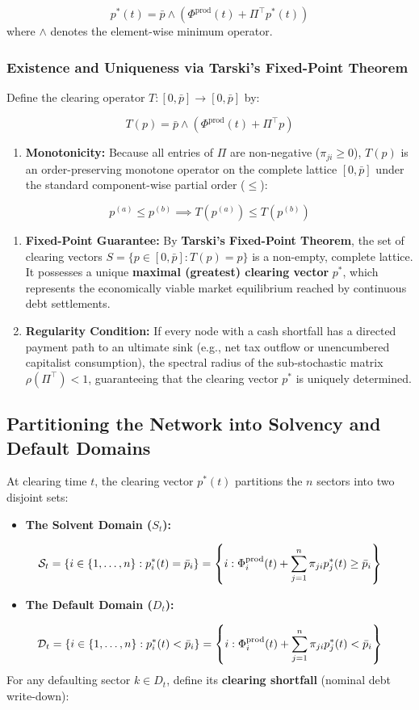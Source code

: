 \documentclass[11pt,letterpaper]{report}
\newcommand{\fitmath}[1]{\begingroup\setbox0=\hbox{$\displaystyle #1$}\ifdim\wd0>\linewidth\resizebox{\linewidth}{!}{$\displaystyle #1$}\else\displaystyle #1\fi\endgroup}
\begin{document}
\[
{p}^{*}(t)=\bar{p}\wedge \left({{\Phi }^{\mathrm{prod}}(t)+{\Pi }^{\top }{p}^{*}(t)}\right)
\]
where $\wedge$ denotes the element-wise minimum operator.

\subsubsection{Existence and Uniqueness via Tarski's Fixed-Point Theorem}
Define the clearing operator $T:[0,\bar{p}]\rightarrow [0,\bar{p}]$ by:

\[
T(p)=\bar{p}\wedge \left({{\Phi }^{\mathrm{prod}}(t)+{\Pi }^{\top }p}\right)
\]
\begin{enumerate}
\item \textbf{Monotonicity:} Because all entries of $\Pi$ are non-negative (${\pi }_{ji}\geq 0$), $T(p)$ is an order-preserving monotone operator on the complete lattice $[0,\bar{p}]$ under the standard component-wise partial order ($\leq$):
\end{enumerate}
\[
p^{(a)} \le p^{(b)} \implies T(p^{(a)}) \le T(p^{(b)})
\]
\begin{enumerate}
\item \textbf{Fixed-Point Guarantee:} By \textbf{Tarski's Fixed-Point Theorem}, the set of clearing vectors $S=\{p\in [0,\bar{p}]:T(p)=p\}$ is a non-empty, complete lattice. It possesses a unique \textbf{maximal (greatest) clearing vector} ${p}^{*}$, which represents the economically viable market equilibrium reached by continuous debt settlements.
\item \textbf{Regularity Condition:} If every node with a cash shortfall has a directed payment path to an ultimate sink (e.g., net tax outflow or unencumbered capitalist consumption), the spectral radius of the sub-stochastic matrix $\rho ({\Pi }^{\top })<1$, guaranteeing that the clearing vector ${p}^{*}$ is uniquely determined.
\end{enumerate}
\subsection{Partitioning the Network into Solvency and Default Domains}
At clearing time $t$, the clearing vector ${p}^{*}(t)$ partitions the $n$ sectors into two disjoint sets:

\begin{itemize}
\item \textbf{The Solvent Domain (${S}_{t}$):}
\end{itemize}
\[\fitmath{\mathcal{S}_t = \left\{ i \in \{1, \dots, n\} : p_i^*(t) = \bar{p}_i \right\} = \left\{ i : \Phi_i^{\text{prod}}(t) + \sum_{j=1}^n \pi_{ji} p_j^*(t) \ge \bar{p}_i \right\}}\]
\begin{itemize}
\item \textbf{The Default Domain (${D}_{t}$):}
\end{itemize}
\[\fitmath{\mathcal{D}_t = \left\{ i \in \{1, \dots, n\} : p_i^*(t) < \bar{p}_i \right\} = \left\{ i : \Phi_i^{\text{prod}}(t) + \sum_{j=1}^n \pi_{ji} p_j^*(t) < \bar{p}_i \right\}}\]
For any defaulting sector $k\in {D}_{t}$, define its \textbf{clearing shortfall} (nominal debt write-down):
\end{document}
